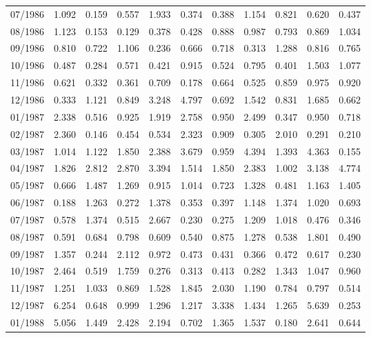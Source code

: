 \begin{tabular}{lrrrrrrrrrr}
07/1986 &  1.092 &  0.159 &  0.557 &  1.933 &  0.374 &  0.388 &  1.154 &  0.821 &  0.620 &  0.437 \\
08/1986 &  1.123 &  0.153 &  0.129 &  0.378 &  0.428 &  0.888 &  0.987 &  0.793 &  0.869 &  1.034 \\
09/1986 &  0.810 &  0.722 &  1.106 &  0.236 &  0.666 &  0.718 &  0.313 &  1.288 &  0.816 &  0.765 \\
10/1986 &  0.487 &  0.284 &  0.571 &  0.421 &  0.915 &  0.524 &  0.795 &  0.401 &  1.503 &  1.077 \\
11/1986 &  0.621 &  0.332 &  0.361 &  0.709 &  0.178 &  0.664 &  0.525 &  0.859 &  0.975 &  0.920 \\
12/1986 &  0.333 &  1.121 &  0.849 &  3.248 &  4.797 &  0.692 &  1.542 &  0.831 &  1.685 &  0.662 \\
01/1987 &  2.338 &  0.516 &  0.925 &  1.919 &  2.758 &  0.950 &  2.499 &  0.347 &  0.950 &  0.718 \\
02/1987 &  2.360 &  0.146 &  0.454 &  0.534 &  2.323 &  0.909 &  0.305 &  2.010 &  0.291 &  0.210 \\
03/1987 &  1.014 &  1.122 &  1.850 &  2.388 &  3.679 &  0.959 &  4.394 &  1.393 &  4.363 &  0.155 \\
04/1987 &  1.826 &  2.812 &  2.870 &  3.394 &  1.514 &  1.850 &  2.383 &  1.002 &  3.138 &  4.774 \\
05/1987 &  0.666 &  1.487 &  1.269 &  0.915 &  1.014 &  0.723 &  1.328 &  0.481 &  1.163 &  1.405 \\
06/1987 &  0.188 &  1.263 &  0.272 &  1.378 &  0.353 &  0.397 &  1.148 &  1.374 &  1.020 &  0.693 \\
07/1987 &  0.578 &  1.374 &  0.515 &  2.667 &  0.230 &  0.275 &  1.209 &  1.018 &  0.476 &  0.346 \\
08/1987 &  0.591 &  0.684 &  0.798 &  0.609 &  0.540 &  0.875 &  1.278 &  0.538 &  1.801 &  0.490 \\
09/1987 &  1.357 &  0.244 &  2.112 &  0.972 &  0.473 &  0.431 &  0.366 &  0.472 &  0.617 &  0.230 \\
10/1987 &  2.464 &  0.519 &  1.759 &  0.276 &  0.313 &  0.413 &  0.282 &  1.343 &  1.047 &  0.960 \\
11/1987 &  1.251 &  1.033 &  0.869 &  1.528 &  1.845 &  2.030 &  1.190 &  0.784 &  0.797 &  0.514 \\
12/1987 &  6.254 &  0.648 &  0.999 &  1.296 &  1.217 &  3.338 &  1.434 &  1.265 &  5.639 &  0.253 \\
01/1988 &  5.056 &  1.449 &  2.428 &  2.194 &  0.702 &  1.365 &  1.537 &  0.180 &  2.641 &  0.644 \\

\end{tabular}
